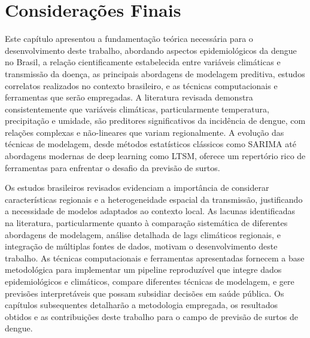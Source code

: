 \section{Considerações Finais}

Este capítulo apresentou a fundamentação teórica necessária para o desenvolvimento deste trabalho, abordando aspectos epidemiológicos da dengue no Brasil, a relação cientificamente estabelecida entre variáveis climáticas e transmissão da doença, as principais abordagens de modelagem preditiva, estudos correlatos realizados no contexto brasileiro, e as técnicas computacionais e ferramentas que serão empregadas. A literatura revisada demonstra consistentemente que variáveis climáticas, particularmente temperatura, precipitação e umidade, são preditores significativos da incidência de dengue, com relações complexas e não-lineares que variam regionalmente. A evolução das técnicas de modelagem, desde métodos estatísticos clássicos como SARIMA até abordagens modernas de deep learning como LTSM, oferece um repertório rico de ferramentas para enfrentar o desafio da previsão de surtos.

Os estudos brasileiros revisados evidenciam a importância de considerar características regionais e a heterogeneidade espacial da transmissão, justificando a necessidade de modelos adaptados ao contexto local. As lacunas identificadas na literatura, particularmente quanto à comparação sistemática de diferentes abordagens de modelagem, análise detalhada de lags climáticos regionais, e integração de múltiplas fontes de dados, motivam o desenvolvimento deste trabalho. As técnicas computacionais e ferramentas apresentadas fornecem a base metodológica para implementar um pipeline reproduzível que integre dados epidemiológicos e climáticos, compare diferentes técnicas de modelagem, e gere previsões interpretáveis que possam subsidiar decisões em saúde pública. Os capítulos subsequentes detalharão a metodologia empregada, os resultados obtidos e as contribuições deste trabalho para o campo de previsão de surtos de dengue.